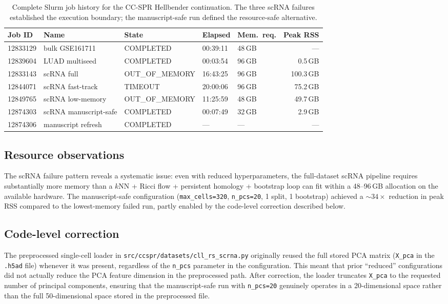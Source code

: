 \documentclass[11pt]{article}
\begin{document}
\begin{table}[h]
\centering
\small
\begin{tabular}{lllllr}
\toprule
Job ID & Name & State & Elapsed & Mem.\ req. & Peak RSS \\
\midrule
12833129 & bulk GSE161711 & COMPLETED & 00:39:11 & 48\,GB & --- \\
12839604 & LUAD multiseed & COMPLETED & 00:03:54 & 96\,GB & 0.5\,GB \\
12833143 & scRNA full & OUT\_OF\_MEMORY & 16:43:25 & 96\,GB & 100.3\,GB \\
12844071 & scRNA fast-track & TIMEOUT & 20:00:06 & 96\,GB & 75.2\,GB \\
12849765 & scRNA low-memory & OUT\_OF\_MEMORY & 11:25:59 & 48\,GB & 49.7\,GB \\
12874303 & scRNA manuscript-safe & COMPLETED & 00:07:49 & 32\,GB & 2.9\,GB \\
12874306 & manuscript refresh & COMPLETED & --- & --- & --- \\
\bottomrule
\end{tabular}
\caption{Complete Slurm job history for the CC-SPR Hellbender continuation.
The three scRNA failures established the execution boundary; the manuscript-safe run defined the resource-safe alternative.}
\label{tab:jobs_supp}
\end{table}

\subsection{Resource observations}

The scRNA failure pattern reveals a systematic issue: even with reduced hyperparameters, the full-dataset scRNA pipeline requires substantially more memory than a $k$NN + Ricci flow + persistent homology + bootstrap loop can fit within a 48--96\,GB allocation on the available hardware.
The manuscript-safe configuration (\texttt{max\_cells=320}, \texttt{n\_pcs=20}, 1 split, 1 bootstrap) achieved a ${\sim}34\times$ reduction in peak RSS compared to the lowest-memory failed run, partly enabled by the code-level correction described below.

\subsection{Code-level correction}
\label{sec:codefix}

The preprocessed single-cell loader in \texttt{src/ccspr/datasets/cll\_rs\_scrna.py} originally reused the full stored PCA matrix (\texttt{X\_pca} in the \texttt{.h5ad} file) whenever it was present, regardless of the \texttt{n\_pcs} parameter in the configuration.
This meant that prior ``reduced'' configurations did not actually reduce the PCA feature dimension in the preprocessed path.
After correction, the loader truncates \texttt{X\_pca} to the requested number of principal components, ensuring that the manuscript-safe run with \texttt{n\_pcs=20} genuinely operates in a 20-dimensional space rather than the full 50-dimensional space stored in the preprocessed file.
\end{document}
